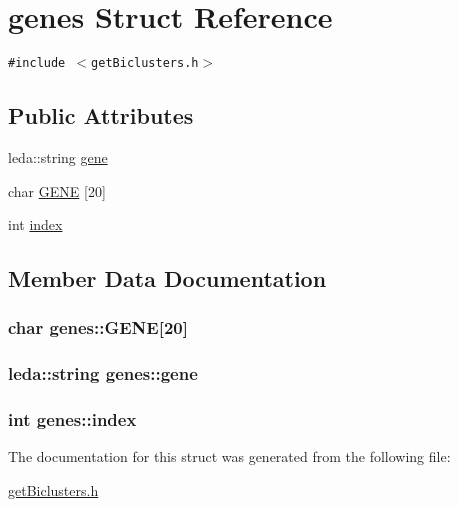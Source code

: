\hypertarget{structgenes}{
\section{genes Struct Reference}
\label{structgenes}
}
{\tt \#include $<$getBiclusters.h$>$}

\subsection*{Public Attributes}
\begin{CompactItemize}
\item 
leda::string \hyperlink{structgenes_6c62aed8eb66d91aba03a53523b30e27}{gene}
\item 
char \hyperlink{structgenes_5516f77c3c52f8ac6392e1ab05b3e58e}{GENE} \mbox{[}20\mbox{]}
\item 
int \hyperlink{structgenes_71f27ece48331cec99b9e9e0ddd6f41d}{index}
\end{CompactItemize}


\subsection{Member Data Documentation}
\hypertarget{structgenes_5516f77c3c52f8ac6392e1ab05b3e58e}{
\subsubsection[{GENE}]{\setlength{\rightskip}{0pt plus 5cm}char {\bf genes::GENE}\mbox{[}20\mbox{]}}}
\label{structgenes_5516f77c3c52f8ac6392e1ab05b3e58e}


\hypertarget{structgenes_6c62aed8eb66d91aba03a53523b30e27}{
\subsubsection[{gene}]{\setlength{\rightskip}{0pt plus 5cm}leda::string {\bf genes::gene}}}
\label{structgenes_6c62aed8eb66d91aba03a53523b30e27}


\hypertarget{structgenes_71f27ece48331cec99b9e9e0ddd6f41d}{
\subsubsection[{index}]{\setlength{\rightskip}{0pt plus 5cm}int {\bf genes::index}}}
\label{structgenes_71f27ece48331cec99b9e9e0ddd6f41d}




The documentation for this struct was generated from the following file:\begin{CompactItemize}
\item 
\hyperlink{getBiclusters_8h}{getBiclusters.h}\end{CompactItemize}
